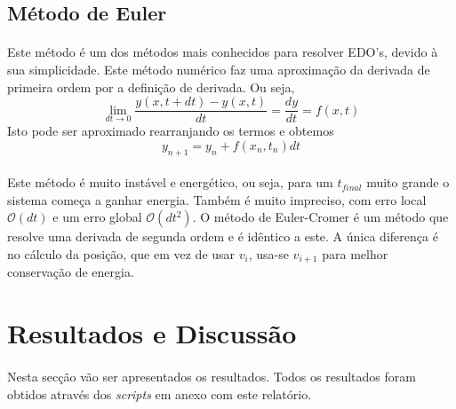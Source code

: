 \documentclass[a4paper, 11pt]{article}
\newcommand{\dydt}{\frac{dy}{dt}}
\begin{document}
	\subsection{Método de Euler}
	\paragraph{}
	Este método é um dos métodos mais conhecidos para resolver EDO's, devido à sua simplicidade. Este método numérico faz uma aproximação da derivada de primeira ordem por a definição de derivada. Ou seja, 
	\begin{equation}
		\lim_{dt\to0}{\frac{y(x, t+dt)-y(x, t)}{dt}}=\dydt=f(x, t)
	\end{equation}
	Isto pode ser aproximado rearranjando os termos e obtemos
	\begin{equation}
		y_{n+1}=y_{n}+f(x_{n}, t_{n})dt
	\end{equation}
	\paragraph{}
	Este método é muito instável e energético, ou seja, para um $t_{final}$ muito grande o sistema começa a ganhar energia. Também é muito impreciso, com erro local $\mathcal{O}(dt)$ e um erro global $\mathcal{O}(dt^{2})$.
	O método de Euler-Cromer é um método que resolve uma derivada de segunda ordem e é idêntico a este. A única diferença é no cálculo da posição, que em vez de usar $v_{i}$, usa-se $v_{i+1}$ para melhor conservação de energia.
	
	\section{Resultados e Discussão}
	\paragraph{}
	Nesta secção vão ser apresentados os resultados. Todos os resultados foram obtidos através dos {\itshape scripts} em anexo com este relatório.
	
\end{document}
